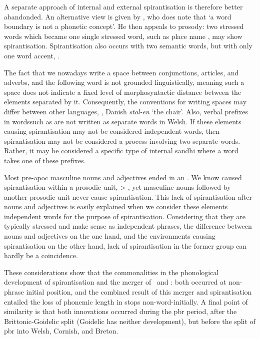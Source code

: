 A separate approach of internal and external spirantisation is therefore better abandonded. An alternative view is given by \textcite[126--129]{koch_neo-brittonic_1989}, who does note that `a word boundary is not a phonetic concept'.
He then appeals to prosody: two stressed words which became one single stressed word, such as place name , may show spirantisation.
Spirantisation also occurs with two semantic words, but with only one word accent, \eg {}.

The fact that we nowadays write a space between conjunctions, articles, and adverbs, \etc and the following word is not grounded linguistically, meaning such a space does not indicate a fixed level of morphosyntactic distance between the elements separated by it. Consequently, the conventions for writing spaces may differ between other languages, \eg {}, Danish \textit{stol-en} `the chair'.
Also, verbal prefixes in wordssuch as  are not written as separate words in Welsh.
If  these elements causing spirantisation may not be considered independent words, then spirantisation may not be considered a process involving two separate words.
Rather, it may be considered a specific type of internal sandhi where a word takes one of these prefixes.

Most pre-\gls{apoc} masculine  nouns and adjectives ended in an .
We know  caused spirantisation within a prosodic unit, \eg {} > , yet masculine nouns followed by another prosodic unit never cause spirantisation.
This lack of spirantisation after nouns and adjectives is easily explained when we consider these elements independent words for the purpose of spirantisation.
Considering that they are typically stressed and make sense as independent phrases, the difference between nouns and adjectives on the one hand, and the environments causing spirantisation on the other hand, lack of spirantisation in the former group can hardly be a coincidence.

These considerations show that the commonalities in the phonological development of spirantisation and the merger of \xD\ and \lT: both occurred at non-phrase initial position, and the combined result of this merger and spirantisation entailed the loss of phonemic length in stops non-word-initially.
A final point of similarity is that both innovations occurred during the \gls{pbr} period, after the Brittonic-Goidelic split (Goidelic has neither development), but before the split of \gls{pbr} into Welsh, Cornish, and Breton.

